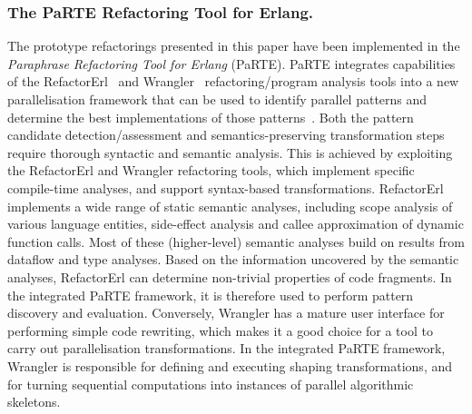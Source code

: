 \documentclass[final]{jfp1}
\begin{document}
\subsubsection{The PaRTE Refactoring Tool for Erlang.}
\label{parte}
The prototype refactorings presented in this paper have been implemented in the  \emph{Paraphrase Refactoring Tool for Erlang} (PaRTE). 
PaRTE integrates capabilities of the RefactorErl~\cite{splst11} and
Wrangler~\cite{wrangler} refactoring/program analysis tools into a new parallelisation
framework that can be used to identify parallel patterns
and determine the best implementations of those patterns~\cite{Bozo}. Both the
pattern candidate detection/assessment and semantics-preserving
transformation steps require thorough syntactic and semantic analysis.
This is achieved by exploiting the RefactorErl and Wrangler refactoring
tools, which implement specific compile-time analyses, and
support syntax-based transformations. RefactorErl implements a
wide range of static semantic analyses, including scope analysis of
various language entities, side-effect analysis and callee approximation
of dynamic function calls. Most of these (higher-level)
semantic analyses build on results from dataflow and type analyses.
Based on the information uncovered by the semantic analyses,
RefactorErl can determine non-trivial properties of code fragments.
In the integrated PaRTE framework, it is therefore used to perform
pattern discovery and evaluation. Conversely, Wrangler has a
mature user interface for performing simple code rewriting, which
makes it a good choice for a tool to carry out parallelisation transformations.
In the integrated PaRTE framework, Wrangler is responsible
for defining and executing shaping transformations, and
for turning sequential computations into instances of parallel algorithmic
skeletons.
\end{document}
